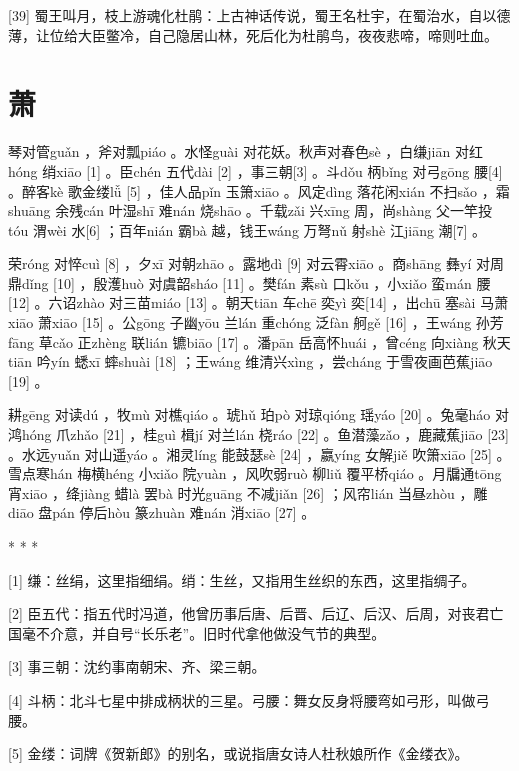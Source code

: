 \documentclass[12pt,UTF8]{ctexbook}
\begin{document}
[39] 蜀王叫月，枝上游魂化杜鹃：上古神话传说，蜀王名杜宇，在蜀治水，自以德薄，让位给大臣鳖冷，自己隐居山林，死后化为杜鹃鸟，夜夜悲啼，啼则吐血。





\chapter{萧}


琴对管guǎn ，斧对瓢piáo 。水怪guài 对花妖。秋声对春色sè ，白缣jiān 对红hóng 绡xiāo [1] 。臣chén 五代dài [2] ，事三朝[3] 。斗dǒu 柄bǐng 对弓gōng 腰[4] 。醉客kè 歌金缕lǚ [5] ，佳人品pǐn 玉箫xiāo 。风定dìng 落花闲xián 不扫sǎo ，霜shuāng 余残cán 叶湿shī 难nán 烧shāo 。千载zǎi 兴xīng 周，尚shàng 父一竿投tóu 渭wèi 水[6] ；百年nián 霸bà 越，钱王wáng 万弩nǔ 射shè 江jiāng 潮[7] 。

荣róng 对悴cuì [8] ，夕xī 对朝zhāo 。露地dì [9] 对云霄xiāo 。商shāng 彝yí 对周鼎dǐng [10] ，殷濩huò 对虞韶sháo [11] 。樊fán 素sù 口kǒu ，小xiǎo 蛮mán 腰[12] 。六诏zhào 对三苗miáo [13] 。朝天tiān 车chē 奕yì 奕[14] ，出chū 塞sài 马萧xiāo 萧xiāo [15] 。公gōng 子幽yōu 兰lán 重chóng 泛fàn 舸gě [16] ，王wáng 孙芳fāng 草cǎo 正zhèng 联lián 镳biāo [17] 。潘pān 岳高怀huái ，曾céng 向xiàng 秋天tiān 吟yín 蟋xī 蟀shuài [18] ；王wáng 维清兴xìng ，尝cháng 于雪夜画芭蕉jiāo [19] 。

耕gēng 对读dú ，牧mù 对樵qiáo 。琥hǔ 珀pò 对琼qióng 瑶yáo [20] 。兔毫háo 对鸿hóng 爪zhǎo [21] ，桂guì 楫jí 对兰lán 桡ráo [22] 。鱼潜藻zǎo ，鹿藏蕉jiāo [23] 。水远yuǎn 对山遥yáo 。湘灵líng 能鼓瑟sè [24] ，嬴yíng 女解jiě 吹箫xiāo [25] 。雪点寒hán 梅横héng 小xiǎo 院yuàn ，风吹弱ruò 柳liǔ 覆平桥qiáo 。月牖通tōng 宵xiāo ，绛jiàng 蜡là 罢bà 时光guāng 不减jiǎn [26] ；风帘lián 当昼zhòu ，雕diāo 盘pán 停后hòu 篆zhuàn 难nán 消xiāo [27] 。



* * *



[1] 缣：丝绢，这里指细绢。绡：生丝，又指用生丝织的东西，这里指绸子。

[2] 臣五代：指五代时冯道，他曾历事后唐、后晋、后辽、后汉、后周，对丧君亡国毫不介意，并自号“长乐老”。旧时代拿他做没气节的典型。

[3] 事三朝：沈约事南朝宋、齐、梁三朝。

[4] 斗柄：北斗七星中排成柄状的三星。弓腰：舞女反身将腰弯如弓形，叫做弓腰。

[5] 金缕：词牌《贺新郎》的别名，或说指唐女诗人杜秋娘所作《金缕衣》。
\end{document}

